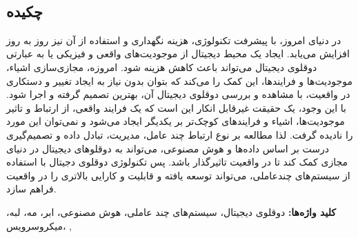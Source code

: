 
\setcounter{page}{1}
\thispagestyle{empty}

~\vfill

\subsection*{چکیده}
\baselineskip=0.7cm



در دنیای امروز، با پیشرفت تکنولوژی، هزینه نگهداری و استفاده از آن نیز روز به روز افزایش می‌یابد. ایجاد یک محیط دیجیتال از موجودیت‌های واقعی و فیزیکی یا به عبارتی دوقلوی دیجیتال می‌تواند باعث کاهش هزینه شود. امروزه، مجازی‌سازی اشیاء، موجودیت‌ها و فرایند‌ها، این کمک را می‌کند که بتوان بدون نیاز به ایجاد تغییر و دستکاری در واقعیت، با مشاهده و بررسی دوقلوی دیجیتال آن، بهترین تصمیم گرفته و اجرا شود. 
با این وجود، یک حقیقت غیرقابل انکار این است که یک فرایند واقعی، از ارتباط و تاثیر موجودیت‌ها، اشیاء و فرایند‌های کوچک‌تر بر یکدیگر ایجاد می‌شود و نمی‌توان این مورد را نادیده گرفت. لذا مطالعه بر نوع ارتباط چند عامل، مدیریت،‌ تبادل داده و تصمیم‌گیری درست بر اساس داده‌ها و هوش مصنوعی، می‌تواند به دوقلو‌های دیجیتال در دنیای مجازی کمک کند تا در واقعیت تاثیرگذار باشد.
پس تکنولوژی دوقلو‌ی دجیتال با استفاده از سیستم‌های چندعاملی، می‌تواند توسعه یافته و قابلیت و کارایی بالاتری را در واقعیت فراهم سازد. \\




\begin{small}


\noindent\textbf{کلید ‌واژه‌ها:}
دوقلو‌ی دیجیتال، سیستم‌های چند عاملی، هوش‌ مصنوعی، ابر، مه، لبه، میکروسرویس،
,
\\


\end{small}